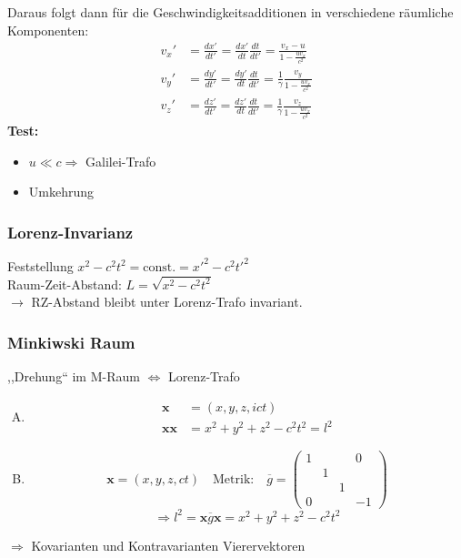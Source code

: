 \documentclass[titlepage,11pt,a4paper,ngerman]{report}
\newcommand{\tx}[1]{\textrm{#1}}
\newcommand{\const}{\tx{const.}}
\renewcommand{\vec}[1]{\boldsymbol{#1}}
\begin{document}
Daraus folgt dann für die Geschwindigkeitsadditionen in verschiedene räumliche Komponenten:
\begin{align*}
v_x' &= \frac{dx'}{dt'} = \frac{dx'}{dt} \frac{dt}{dt'} = \frac{v_x - u}{1 - \frac{uv_x}{c^2}} \\
v_y' &= \frac{dy'}{dt'} = \frac{dy'}{dt} \frac{dt}{dt'} = \frac{1}{\gamma} \frac{v_y}{1 - \frac{uv_x}{c^2}}\\
v_z' &= \frac{dz'}{dt'} = \frac{dz'}{dt} \frac{dt}{dt'} = \frac{1}{\gamma} \frac{v_z}{1 - \frac{uv_x}{c^2}}
\end{align*}
\textbf{Test:}\\
\begin{itemize}
	\item $ u \ll c \Rightarrow $ Galilei-Trafo
	\item Umkehrung
\end{itemize}

\subsubsection{Lorenz-Invarianz}
Feststellung $ x^2 - c^2t^2 = \const = x'^2 - c^2 t'^2 $\\[5pt]
Raum-Zeit-Abstand: $ L = \sqrt{x^2 - c^2 t^2} $\\
$ \rightarrow $ RZ-Abstand bleibt unter Lorenz-Trafo invariant.

\subsubsection{Minkiwski Raum}
,,Drehung`` im M-Raum $ \Leftrightarrow $ Lorenz-Trafo
\begin{enumerate}[A)]
	\item \begin{align*}
	\vec{x} &= (x,y,z,ict) \\
	\vec{x} \vec{x} &= x^2 + y^2 + z^2 - c^2 t^2 = l^2
	\end{align*}
	\item \begin{equation*}
	\vec{x} = (x,y,z,ct) \quad  \tx{Metrik:} \quad  \overline{g} = {\scriptstyle \begin{pmatrix}
	1 & & & 0 \\ & 1\\ & & 1 \\ 0 & & & -1
	\end{pmatrix}} \end{equation*}
	\begin{equation*}
	\Rightarrow l^2 = \vec{x} \overline{g} \vec{x} = x^2 + y^2 + z^2 - c^2 t^2
	\end{equation*}
\end{enumerate}
$ \Rightarrow $ Kovarianten und Kontravarianten Vierervektoren
\end{document}
